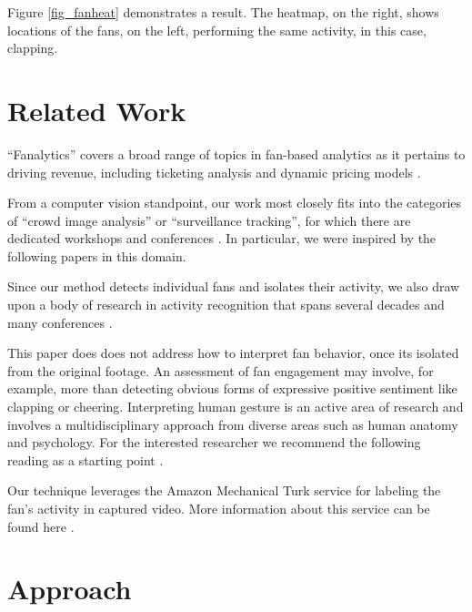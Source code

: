 \documentclass[times, 10pt,twocolumn]{article}
\begin{document}
Figure \ref{fig_fanheat} demonstrates a result.  The heatmap, on the right, shows locations of the fans, on the left, performing the same activity, in this case, clapping. 

\section{Related Work}
\label{sec_related}

``Fanalytics'' covers a broad range of topics in fan-based analytics as it pertains to driving revenue, including ticketing analysis and dynamic pricing models \cite{fanalytics} \cite{ticketmaster} \cite{ticketmaster2} \cite{ticketinganalytics} \cite{ticketinganalytics2}.

From a computer vision standpoint, our work most closely fits into the categories of ``crowd image analysis'' or ``surveillance tracking'', for which there are dedicated workshops and conferences \cite{pets} \cite{msvalc}.  In particular, we were inspired by the following papers \cite{trackingunstructured} \cite{trackingsmallgroups} in this domain.

Since our method detects individual fans and isolates their activity, we also draw upon a body of research in activity recognition that spans several decades and many conferences \cite{modelbasedimage} \cite{modelbasedvision} \cite{humanmotionanalysis} \cite{threedeemodel} \cite{modelrec} \cite{modelbasedtracking} \cite{trackingpeople} \cite{modelbasedest} \cite{articbody} \cite{stochastic}.

This paper does does not address how to interpret fan behavior, once its isolated from the original footage.  An assessment of fan engagement may involve, for example, more than detecting obvious forms of expressive positive sentiment like clapping or cheering.  Interpreting human gesture is an active area of research and involves a multidisciplinary approach from diverse areas such as human anatomy and psychology.  For the interested researcher we recommend the following reading as a starting point \cite{laban}.

Our technique leverages the Amazon Mechanical Turk service for labeling the fan's activity in captured video.  More information about this service can be found here \cite{amazon}.  

\section{Approach}
\end{document}
